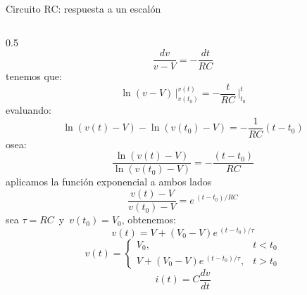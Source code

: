 \documentclass[aspectratio=169]{beamer}
\begin{document}
\begin{frame}{Circuito RC: respuesta a un escalón}
\begin{columns}[onlytextwidth]
\begin{column}{0.5\textwidth}
{{            \begin{equation*}
                \dfrac{dv}{v-V} = -\dfrac{dt}{RC}
            \end{equation*}
            }
        }
            {
            {tenemos que:
            \begin{equation*}
                \ln(v-V)\,\bigg|_{v(t_0)}^{v(t)} = -\frac{t}{RC}\,\bigg|_{t_0}^{t}
            \end{equation*}
            }
            {evaluando:
            \begin{equation*}
                \ln(v(t)-V) - \ln (v(t_0)-V) = -\frac{1}{RC}(t - t_0)
            \end{equation*}
            }
            {osea:
            \begin{equation*}
                \dfrac{\ln(v(t)-V)}{\ln (v(t_0)-V)} = -\frac{(t - t_0)}{RC}
            \end{equation*}
            }
        }
            {
            {aplicamos la función exponencial a ambos lados
            \begin{equation*}
                \dfrac{v(t)-V}{v(t_0)-V} = e\,^{(t - t_0)/RC}
            \end{equation*}
            }
            {sea $\tau=RC\,$ y $\,v(t_0) = V_0$, obtenemos:
            \begin{equation*}
                v(t)=V + (V_0-V)e\,^{(t - t_0)/ \tau}
            \end{equation*}
            }
        }
            {
            {\begin{equation*}
                v(t) =
                \begin{cases}
                    V_0, & t < t_0\\
                    V + (V_0-V)e\,^{(t - t_0)/ \tau}, & t > t_0
                \end{cases}
            \end{equation*}
            }
            {\begin{equation*}
                i(t) = C\dfrac{dv}{dt} 
            \end{equation*}
}}
\end{column}
\end{columns}
\end{frame}
\end{document}
